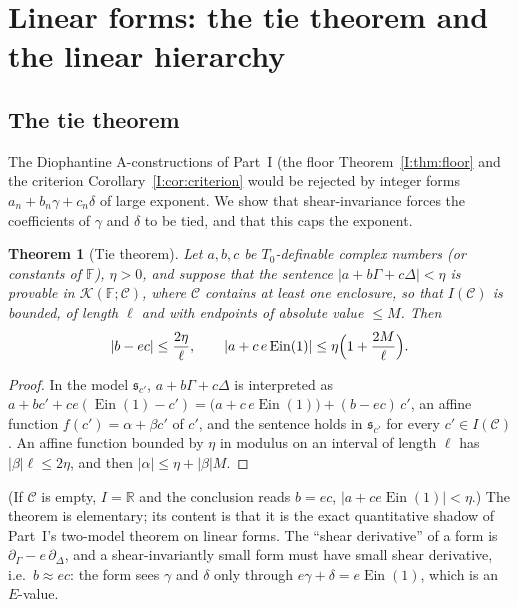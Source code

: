 \documentclass[11pt,a4paper]{article}
\newcommand{\R}{\mathbb R}
\newcommand{\Ein}{\operatorname{Ein}}
\newcommand{\Fld}{\mathbb F}
\newcommand{\Th}{\mathcal K}
\newcommand{\shear}{\mathfrak s}
\newcommand{\Tz}{T_0}
\newtheorem{theorem}{Theorem}[section]
\theoremstyle{definition}
\theoremstyle{remark}
\numberwithin{equation}{section}
\begin{document}
\section{Linear forms: the tie theorem and the linear hierarchy}\label{III:sec:linear}

\subsection{The tie theorem}

The Diophantine $\mathrm A$-constructions of Part~I (the floor Theorem~\ref{I:thm:floor} and the
criterion Corollary~\ref{I:cor:criterion} would be rejected by integer forms $a_n+b_n\gamma+c_n\delta$ of
large exponent. We show that shear-invariance forces the coefficients of $\gamma$ and
$\delta$ to be tied, and that this caps the exponent.

\begin{theorem}[Tie theorem]\label{III:thm:tie}
Let $a,b,c$ be $\Tz$-definable complex numbers (or constants of $\Fld$), $\eta>0$, and
suppose that the sentence $|a+b\Gamma+c\Delta|<\eta$ is provable in $\Th(\Fld;\mathcal C)$,
where $\mathcal C$ contains at least one enclosure, so that $I(\mathcal C)$ is bounded, of
length $\ell$ and with endpoints of absolute value $\le M$. Then
\begin{equation}\label{III:eq:tie}
 |b-ec|\le\frac{2\eta}{\ell},\qquad |a+c\,e\Ein(1)|\le\eta\Bigl(1+\frac{2M}{\ell}\Bigr).
\end{equation}
\end{theorem}
\begin{proof}
In the model $\shear_{c'}$, $a+b\Gamma+c\Delta$ is interpreted as
$a+bc'+ce(\Ein(1)-c')=\bigl(a+c\,e\Ein(1)\bigr)+(b-ec)\,c'$, an affine function
$f(c')=\alpha+\beta c'$ of $c'$, and the sentence holds in $\shear_{c'}$ for every
$c'\in I(\mathcal C)$. An affine function bounded by $\eta$ in modulus on an interval of
length $\ell$ has $|\beta|\ell\le2\eta$, and then $|\alpha|\le\eta+|\beta|M$.
\end{proof}

(If $\mathcal C$ is empty, $I=\R$ and the conclusion reads $b=ec$, $|a+ce\Ein(1)|<\eta$.)
The theorem is elementary; its content is that it is the exact quantitative shadow of
Part~I's two-model theorem on linear forms. The ``shear derivative'' of a form is
$\partial_\Gamma-e\,\partial_\Delta$, and a shear-invariantly small form must have small
shear derivative, i.e.\ $b\approx ec$: the form sees $\gamma$ and $\delta$ only through
$e\gamma+\delta=e\Ein(1)$, which is an $E$-value.
\end{document}
